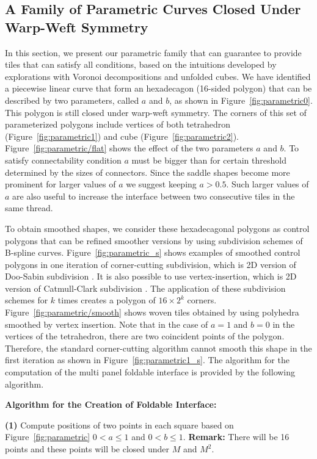 \documentclass[times,twocolumn,final]{elsarticle}
\begin{document}
\subsection{A Family of Parametric Curves Closed Under Warp-Weft Symmetry}

In this section, we present our parametric family that can guarantee to provide tiles that can satisfy all conditions, based on the intuitions developed by explorations with Voronoi decompositions and unfolded cubes. We have identified a piecewise linear curve that form an hexadecagon (16-sided polygon) that can be described by two parameters, called $a$ and $b$, as shown in  Figure~\ref{fig:parametric0}. This polygon is still closed under warp-weft symmetry. The corners of this set of parameterized polygons include vertices of both tetrahedron (Figure~\ref{fig:parametric1}) and cube (Figure~\ref{fig:parametric2}). Figure~\ref{fig:parametric/flat} shows the effect of the two parameters $a$ and $b$. To satisfy connectability condition $a$ must be bigger than for certain threshold determined by the sizes of connectors. Since the saddle shapes become more prominent for larger values of $a$ we suggest keeping $a> 0.5$. Such larger values of $a$ are also useful to increase the interface between two consecutive tiles in the same thread. 

To obtain smoothed shapes, we consider these hexadecagonal polygons as control polygons that can be refined smoother versions by using subdivision schemes of B-spline curves. 
Figure~\ref{fig:parametric_s} shows examples of smoothed control polygons in one iteration of corner-cutting subdivision, which is 2D version of Doo-Sabin subdivision \cite{doo1978behaviour}.  It is also possible to use vertex-insertion, which is 2D version of Catmull-Clark subdivision \cite{catmull1978recursively}. The application of these subdivision schemes for $k$ times creates a polygon of $16 \times 2^k$ corners. Figure~\ref{fig:parametric/smooth} shows woven tiles obtained by using polyhedra smoothed by vertex insertion. Note that in the case of $a=1$ and $b=0$ in the vertices of the tetrahedron, there are two coincident points of the polygon. Therefore, the standard corner-cutting algorithm cannot smooth this shape in the first iteration as shown in Figure~\ref{fig:parametric1_s}.
The algorithm for the computation of the multi panel foldable interface is provided by the following algorithm. 


\textbf{Algorithm for the Creation of Foldable Interface:}

\noindent
\textbf{(1)} Compute positions of two points in each square based on Figure~\ref{fig:parametric} $0<a \leq 1$ and $0<b \leq 1$. \textbf{Remark:} There will be 16 points and these points will be closed under $M$ and $M^2$.
\end{document}
